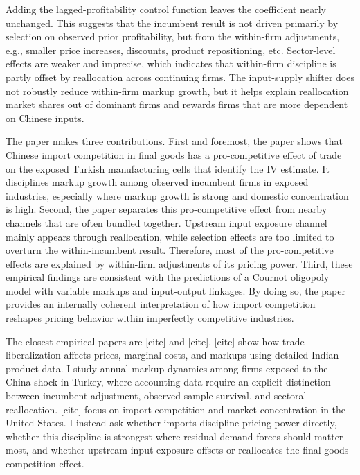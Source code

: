 \documentclass[12pt]{article}
\newcommand{\textcite}[2][]{[cite]}
\begin{document}
Adding the lagged-profitability control function leaves the coefficient nearly unchanged. This suggests that the incumbent result is not driven primarily by selection on observed prior profitability, but from the within-firm adjustments, e.g., smaller price increases, discounts, product repositioning, etc. Sector-level effects are weaker and imprecise, which indicates that within-firm discipline is partly offset by reallocation across continuing firms. The input-supply shifter does not robustly reduce within-firm markup growth, but it helps explain reallocation market shares out of dominant firms and rewards firms that are more dependent on Chinese inputs.

The paper makes three contributions. First and foremost, the paper shows that Chinese import competition in final goods has a pro-competitive effect of trade on the exposed Turkish manufacturing cells that identify the IV estimate. It disciplines markup growth among observed incumbent firms in exposed industries, especially where markup growth is strong and domestic concentration is high. Second, the paper separates this pro-competitive effect from nearby channels that are often bundled together. Upstream input exposure channel mainly appears through reallocation, while selection effects are too limited to overturn the within-incumbent result. Therefore, most of the pro-competitive effects are explained by within-firm adjustments of its pricing power. Third, these empirical findings are consistent with the predictions of a Cournot oligopoly model with variable markups and input-output linkages. By doing so, the paper provides an internally coherent interpretation of how import competition reshapes pricing behavior within imperfectly competitive industries.

The closest empirical papers are \textcite{deloeckerPricesMarkupsTrade2016} and \textcite{amitiUSMarketConcentration2025}. \textcite{deloeckerPricesMarkupsTrade2016} show how trade liberalization affects prices, marginal costs, and markups using detailed Indian product data. I study annual markup dynamics among firms exposed to the China shock in Turkey, where accounting data require an explicit distinction between incumbent adjustment, observed sample survival, and sectoral reallocation. \textcite{amitiUSMarketConcentration2025} focus on import competition and market concentration in the United States. I instead ask whether imports discipline pricing power directly, whether this discipline is strongest where residual-demand forces should matter most, and whether upstream input exposure offsets or reallocates the final-goods competition effect.
\end{document}
